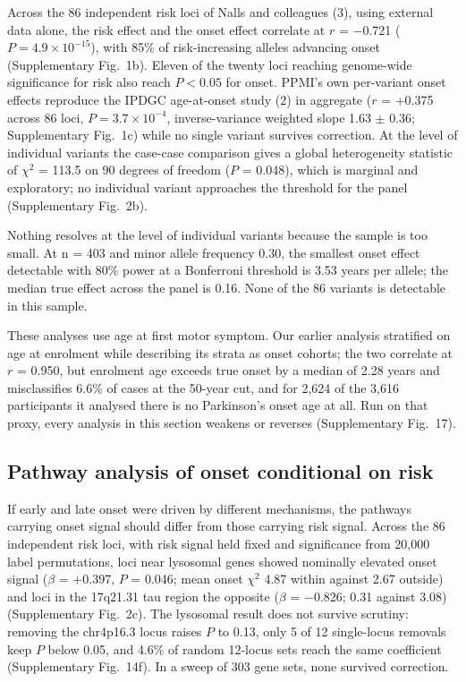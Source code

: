 \documentclass[10pt]{article}
\begin{document}
Across the 86 independent risk loci of Nalls and colleagues (3), using external data alone, the risk effect and the onset effect
correlate at $r$ = $-$0.721 ($P = 4.9\times10^{-15}$), with 85\% of risk-increasing alleles
advancing onset (Supplementary Fig.~1b). Eleven of the twenty loci reaching genome-wide significance for risk
also reach $P < 0.05$ for onset. PPMI's own per-variant onset effects reproduce the IPDGC age-at-onset study (2) in aggregate ($r$ = +0.375 across 86 loci, $P = 3.7\times10^{-4}$,
inverse-variance weighted slope 1.63 $\pm$ 0.36; Supplementary Fig.~1c) while no single variant survives
correction. At
the level of individual variants the case-case comparison gives a global heterogeneity statistic
of $\chi^2$ = 113.5 on 90 degrees of freedom ($P$ = 0.048), which is marginal and exploratory; no
individual variant approaches the threshold for the panel (Supplementary Fig.~2b).

Nothing resolves at the level of individual variants because the sample is too small. At n = 403 and minor allele frequency 0.30, the
smallest onset effect detectable with 80\% power at a Bonferroni threshold is 3.53 years per
allele; the median true effect across the panel is 0.16. None of the 86 variants is detectable in
this sample.

These analyses use age at first motor symptom. Our earlier analysis stratified on age at enrolment
while describing its strata as onset cohorts; the two correlate at $r$ = 0.950, but enrolment age
exceeds true onset by a median of 2.28 years and misclassifies 6.6\% of cases at the 50-year cut,
and for 2,624 of the 3,616 participants it analysed there is no Parkinson's onset age at all. Run
on that proxy, every analysis in this section weakens or reverses (Supplementary Fig.~17).

\subsection*{Pathway analysis of onset conditional on risk}

If early and late onset were driven by different mechanisms, the pathways carrying onset signal
should differ from those carrying risk signal. Across the 86 independent risk loci, with risk
signal held fixed and significance from 20,000 label permutations, loci near lysosomal genes
showed nominally elevated onset signal ($\beta$ = +0.397, $P$ = 0.046; mean onset $\chi^2$ 4.87
within against 2.67 outside) and loci in the 17q21.31 tau region the opposite ($\beta$ =
$-$0.826; 0.31 against 3.08) (Supplementary Fig.~2c). The lysosomal result does not survive scrutiny: removing
the chr4p16.3 locus raises $P$ to 0.13, only 5 of 12 single-locus removals keep $P$ below 0.05,
and 4.6\% of random 12-locus sets reach the same coefficient (Supplementary Fig.~14f). In a sweep
of 303 gene sets, none survived correction.
\end{document}
